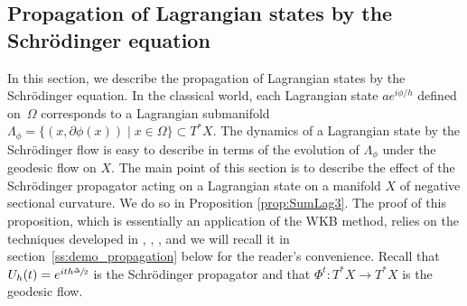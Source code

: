 \documentclass[10pt]{amsart}
\let\sep\mid
\theoremstyle{plain}
\theoremstyle{definition}
\begin{document}
\subsection{Propagation of Lagrangian states by the Schrödinger equation}\label{ss:propagation}

In this section, we describe the propagation of Lagrangian states by the Schrödinger equation. In the classical world, each Lagrangian state $ae^{i\phi/h}$ defined on~$\Omega$ corresponds to a Lagrangian submanifold $\Lambda_\phi=\{(x,\partial\phi(x))\sep x\in\Omega\}\subset T^*X$. The dynamics of a Lagrangian state by the Schrödinger flow is easy to describe in terms of the evolution of $\Lambda_\phi$ under the geodesic flow on $X$. The main point of this section is to describe the effect of the Schrödinger propagator acting on a Lagrangian state on a manifold $X$ of negative sectional curvature. We do so in Proposition \ref{prop:SumLag3}. The proof of this proposition, which is essentially an application of the WKB method, relies on the techniques developed in \cite{Anan}, \cite{AN}, \cite{NZ}, and we will recall it in section~\ref{ss:demo_propagation} below for the reader's convenience. Recall that $U_h(t)=e^{ith\sfrac{\Delta}{2}}$ is the Schrödinger propagator and that $\Phi^t:T^*X\to T^*X$ is the geodesic flow.
\end{document}
